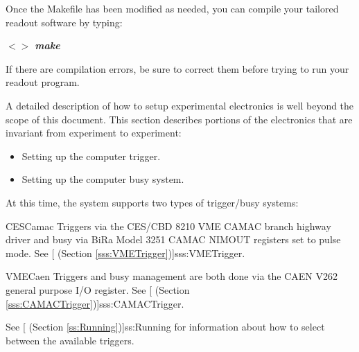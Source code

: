 	Once the Makefile has been modified as needed, you can compile your 
   tailored readout software by typing:
   \begin{example}
   \it{ $<>$ } \bf{make}
   \end{example}
   
   If there are compilation errors, be sure to correct them before trying
   to run your readout program.

   A detailed description of how to setup experimental electronics
   is well beyond the scope of this document.  This section describes
   portions of the electronics that are invariant from experiment to experiment:
   \begin{itemize}
      \item Setting up the computer trigger.
      \item Setting up the computer busy system.
   \end{itemize}
   
   At this time, the system supports two types of trigger/busy 
   systems:
   \begin{description}
      \item{CESCamac} Triggers via the CES/CBD 8210 VME CAMAC
	 branch highway driver and busy via BiRa Model 3251 CAMAC NIMOUT
	 registers set to pulse mode. See [
	  (Section \ref{sss:VMETrigger})]{sss:VMETrigger}.
      \item{VMECaen}  Triggers and busy management are both done via
	 the CAEN V262 general purpose I/O register. See
	 [
	 (Section \ref{sss:CAMACTrigger})]{sss:CAMACTrigger}.
   \end{description}
   
   See [
      (Section \ref{ss:Running})]{ss:Running} for information
      about how to select between the available triggers.
      
